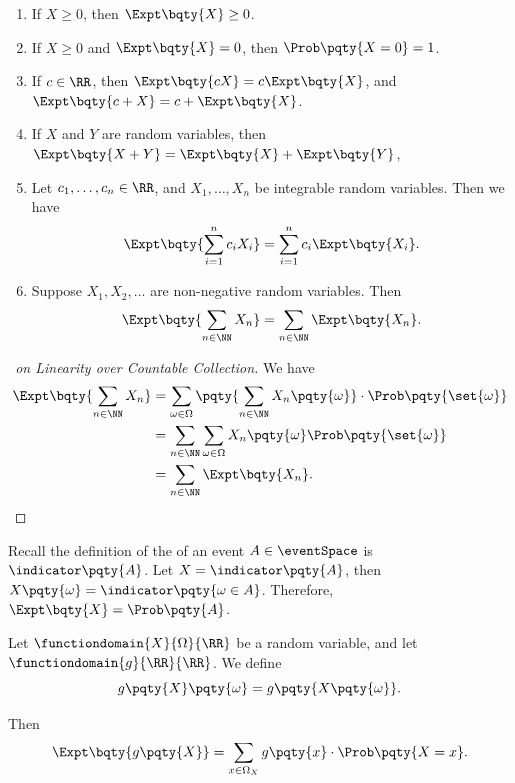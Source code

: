 \begin{proposition}
    \label{prop:properties-expectation}%
    \begin{enumerate}
        \item If \(X \geq 0\), then \(\Expt\bqty{X} \geq 0\).
        \item If \(X \geq 0\) and \(\Expt\bqty{X} = 0 \), then \(\Prob\pqty{X = 0} = 1\).
        \item If \(c \in \RR\), then \(\Expt\bqty{cX} = c \Expt\bqty{X}\), and \(\Expt\bqty{c + X} = c + \Expt\bqty{X}\).
        \item If \(X\) and \(Y\) are random variables, then \(\Expt\bqty{X + Y} = \Expt\bqty{X} + \Expt\bqty{Y}\),
        \item Let \(c_1, \ldots, c_n \in \RR\), and \(X_1, \ldots, X_n\) be integrable random variables. Then we have
        \[
            \Expt \bqty{\sum_{i = 1}^{n} c_i X_i} = \sum_{i = 1}^{n} c_i \Expt \bqty{X_i}.
        \]
        \item Suppose \(X_1, X_2, \ldots\) are non-negative random variables. Then
        \[
            \Expt\bqty{\sum_{n \in \NN} X_n} = \sum_{n \in \NN} \Expt\bqty{X_n}.
        \]
    \end{enumerate}
\end{proposition}

\begin{proof}[\proofname\ on Linearity over Countable Collection]
    We have
    \begin{align*}
        \Expt\bqty{\sum_{n \in \NN} X_n} &= \sum_{\omega \in \Omega} \pqty{\sum_{n \in \NN} X_n \pqty{\omega}} \cdot \Prob\pqty{\set{\omega}} \\
        &= \sum_{n \in \NN} \sum_{\omega \in \Omega} X_n \pqty{\omega} \Prob\pqty{\set{\omega}} \\
        &= \sum_{n \in \NN} \Expt\bqty{X_n}.
    \end{align*}
\end{proof}

\begin{example}
    \label{ex:expectation-indicator}%
    Recall the definition of the  of an event \(A \in \eventSpace\) is \(\indicator\pqty{A}\). Let \(X = \indicator\pqty{A}\), then \(X\pqty{\omega} = \indicator\pqty{\omega \in A}\). Therefore, \(\Expt\bqty{X} = \Prob\pqty{A}\).
\end{example}

\begin{proposition}
    \label{prop:expectation-function-random-variable}%
    Let \(\functiondomain{X}{\Omega}{\RR}\) be a random variable, and let \(\functiondomain{g}{\RR}{\RR}\). We define
    \[
        g\pqty{X} \pqty{\omega} = g\pqty{X\pqty{\omega}}.
    \]

    Then
    \[
        \Expt\bqty{g\pqty{X}} = \sum_{x \in \Omega_X} g\pqty{x} \cdot \Prob\pqty{X = x}.
    \]
\end{proposition}

